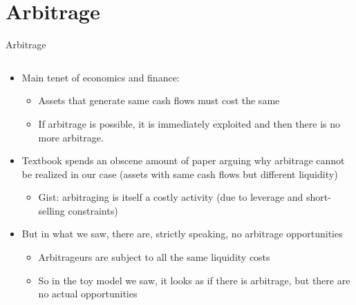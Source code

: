 \documentclass[english,10pt
,aspectratio=169
]{beamer}
\begin{document}
\section{Arbitrage}

\begin{frame}{Arbitrage}
	\begin{columns}
		\begin{column}{0.7\linewidth}
			{
				\begin{itemize}
					\item Main tenet of economics and finance: 
					\begin{itemize}
						\item Assets that generate same cash flows must cost the same
						\item If arbitrage is possible, it is immediately exploited and then there is no more arbitrage.
					\end{itemize}
					\pause[4]
					\item Textbook spends an obscene amount of paper arguing \alert{why arbitrage cannot be realized} in our case (assets with same cash flows but different liquidity)
					\begin{itemize}
						\item Gist: arbitraging is itself a costly activity (due to leverage and short-selling constraints)
					\end{itemize}
					\item But in what we saw, there are, strictly speaking, no arbitrage opportunities
					\begin{itemize}
						\item Arbitrageurs are subject to all the same liquidity costs
						\item So in the toy model we saw, it looks as if there is arbitrage, but there are no actual opportunities

\end{itemize}
\end{itemize}}
\end{column}
\end{columns}
\end{frame}
\end{document}

